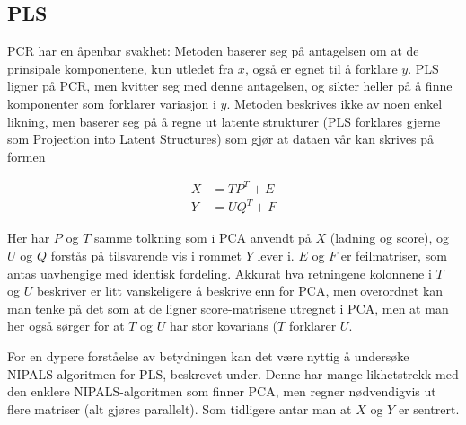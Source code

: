 \subsection{PLS}
PCR har en åpenbar svakhet: Metoden baserer seg på antagelsen om at de prinsipale komponentene, kun utledet fra $x$, også er egnet til å forklare $y$. PLS ligner på PCR, men kvitter seg med denne antagelsen, og sikter heller på å finne komponenter som forklarer variasjon i $y$. Metoden beskrives ikke av noen enkel likning, men baserer seg på å regne ut latente strukturer (PLS forklares gjerne som Projection into Latent Structures) som gjør at dataen vår kan skrives på formen

\begin{align}
	X & = T P^T + E \\
	Y & = U Q^T + F
\end{align}

Her har $P$ og $T$ samme tolkning som i PCA anvendt på $X$ (ladning og score), og $U$ og $Q$ forstås på tilsvarende vis i rommet $Y$ lever i. $E$ og $F$ er feilmatriser, som antas uavhengige med identisk fordeling. Akkurat hva retningene kolonnene i $T$ og $U$ beskriver er litt vanskeligere å beskrive enn for PCA, men overordnet kan man tenke på det som at de ligner score-matrisene utregnet i PCA, men at man her også sørger for at $T$ og $U$ har stor kovarians ($T$ forklarer $U$.

For en dypere forståelse av betydningen kan det være nyttig å undersøke NIPALS-algoritmen for PLS, beskrevet under. Denne har mange likhetstrekk med den enklere NIPALS-algoritmen som finner PCA, men regner nødvendigvis ut flere matriser (alt gjøres parallelt). Som tidligere antar man at $X$ og $Y$ er sentrert.


